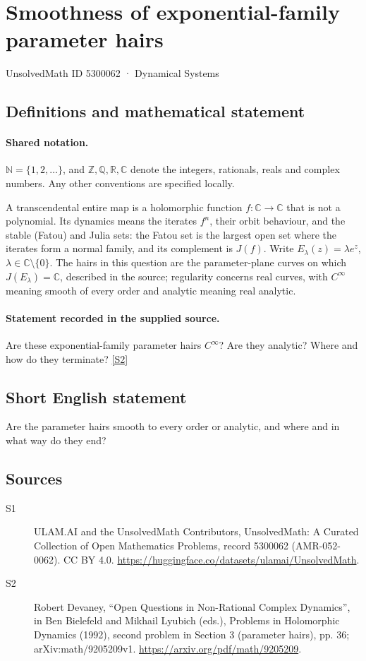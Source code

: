 \documentclass[11pt]{article}
\newcommand{\sref}[2]{\hyperlink{source:#1:#2}{[S#2]}}
\begin{document}
\setcounter{section}{5300061}
\section{Smoothness of exponential-family parameter hairs}\label{5300062}
{\small\sffamily UnsolvedMath ID 5300062 · Dynamical Systems}
\subsection{Definitions and mathematical statement}

\paragraph{Shared notation.}$\mathbb N=\{1,2,\ldots\}$, and $\mathbb Z,\mathbb Q,\mathbb R,\mathbb C$ denote the integers, rationals, reals and complex numbers. Any other conventions are specified locally.


A transcendental entire map is a holomorphic function $f:\mathbb C\to\mathbb C$ that is not a polynomial. Its dynamics means the iterates $f^n$, their orbit behaviour, and the stable (Fatou) and Julia sets: the Fatou set is the largest open set where the iterates form a normal family, and its complement is $J(f)$. Write $E_\lambda(z)=\lambda e^z$, $\lambda\in\mathbb C\setminus\{0\}$. The hairs in this question are the parameter-plane curves on which $J(E_\lambda)=\mathbb C$, described in the source; regularity concerns real curves, with $C^\infty$ meaning smooth of every order and analytic meaning real analytic.
\paragraph{Statement recorded in the supplied source.}
Are these exponential-family parameter hairs $C^\infty$? Are they analytic? Where and how do they terminate? \sref{5300062}{2}
\subsection{Short English statement}
Are the parameter hairs smooth to every order or analytic, and where and in what way do they end?
\subsection{Sources}
\begin{description}
\item[\hypertarget{source:5300062:1}{S1}] ULAM.AI and the UnsolvedMath Contributors, UnsolvedMath: A Curated Collection of Open Mathematics Problems, record 5300062 (AMR-052-0062). CC BY 4.0. \url{https://huggingface.co/datasets/ulamai/UnsolvedMath}.
\item[\hypertarget{source:5300062:2}{S2}] Robert Devaney, ``Open Questions in Non-Rational Complex Dynamics'', in Ben Bielefeld and Mikhail Lyubich (eds.), Problems in Holomorphic Dynamics (1992), second problem in Section 3 (parameter hairs), pp. 36; arXiv:math/9205209v1. \url{https://arxiv.org/pdf/math/9205209}.
\end{description}
\label{end:5300062}
\end{document}
